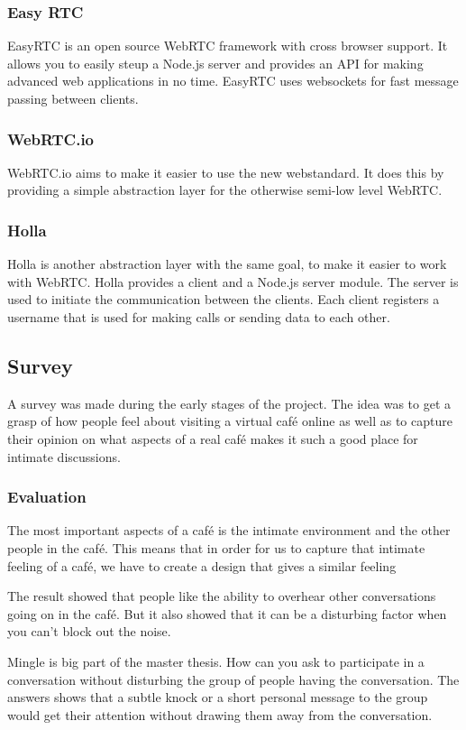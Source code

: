 \documentclass[12pt, titlepage]{article}
\begin{document}
\subsubsection{Easy RTC}
EasyRTC is an open source WebRTC framework with cross browser support. It allows you to easily steup a Node.js server and provides an API for making advanced web applications in no time. EasyRTC uses websockets for fast message passing between clients.
\subsubsection{WebRTC.io}
WebRTC.io aims to make it easier to use the new webstandard. It does this by providing a simple abstraction layer for the otherwise semi-low level WebRTC.
\subsubsection{Holla}
Holla is another abstraction layer with the same goal, to make it easier to work with WebRTC. Holla provides a client and a Node.js server module. The server is used to initiate the communication between the clients. Each client registers a username that is used for making calls or sending data to each other.
\subsection{Survey}
A survey was made during the early stages of the project. The idea was to get a grasp of how people feel about visiting a virtual café online as well as to capture their opinion on what aspects of a real café makes it such a good place for intimate discussions.
\subsubsection{Evaluation}
The most important aspects of a café is the intimate environment and the other people in the café. This means that in order for us to capture that intimate feeling of a café, we have to create a design that gives a similar feeling

The result showed that people like the ability to overhear other conversations going on in the café. But it also showed that it can be a disturbing factor when you can’t block out the noise.

Mingle is big part of the master thesis. How can you ask to participate in a conversation without disturbing the group of people having the conversation. The answers shows that a subtle knock or a short personal message to the group would get their attention without drawing them away from the conversation.
\end{document}
